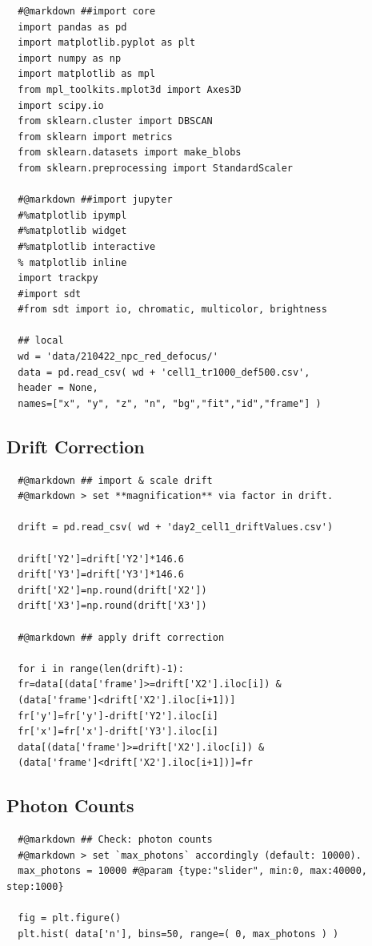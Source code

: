 \documentclass[11pt, a4paper, oneside, twocolumn]{report}
\begin{document}
\begin{verbatim}
  #@markdown ##import core
  import pandas as pd
  import matplotlib.pyplot as plt
  import numpy as np
  import matplotlib as mpl
  from mpl_toolkits.mplot3d import Axes3D
  import scipy.io
  from sklearn.cluster import DBSCAN
  from sklearn import metrics
  from sklearn.datasets import make_blobs
  from sklearn.preprocessing import StandardScaler

  #@markdown ##import jupyter
  #%matplotlib ipympl
  #%matplotlib widget
  #%matplotlib interactive
  % matplotlib inline
  import trackpy
  #import sdt
  #from sdt import io, chromatic, multicolor, brightness
  
  ## local
  wd = 'data/210422_npc_red_defocus/'
  data = pd.read_csv( wd + 'cell1_tr1000_def500.csv',
  header = None,
  names=["x", "y", "z", "n", "bg","fit","id","frame"] )
\end{verbatim}

\subsection{Drift Correction}

\begin{verbatim}
  #@markdown ## import & scale drift
  #@markdown > set **magnification** via factor in drift.

  drift = pd.read_csv( wd + 'day2_cell1_driftValues.csv')

  drift['Y2']=drift['Y2']*146.6
  drift['Y3']=drift['Y3']*146.6
  drift['X2']=np.round(drift['X2'])
  drift['X3']=np.round(drift['X3'])

  #@markdown ## apply drift correction

  for i in range(len(drift)-1):
  fr=data[(data['frame']>=drift['X2'].iloc[i]) &
  (data['frame']<drift['X2'].iloc[i+1])]
  fr['y']=fr['y']-drift['Y2'].iloc[i]
  fr['x']=fr['x']-drift['Y3'].iloc[i]
  data[(data['frame']>=drift['X2'].iloc[i]) &
  (data['frame']<drift['X2'].iloc[i+1])]=fr
\end{verbatim}


\subsection{Photon Counts}

\begin{verbatim}
  #@markdown ## Check: photon counts
  #@markdown > set `max_photons` accordingly (default: 10000).
  max_photons = 10000 #@param {type:"slider", min:0, max:40000, step:1000}
  
  fig = plt.figure()
  plt.hist( data['n'], bins=50, range=( 0, max_photons ) )
\end{verbatim}
\end{document}
